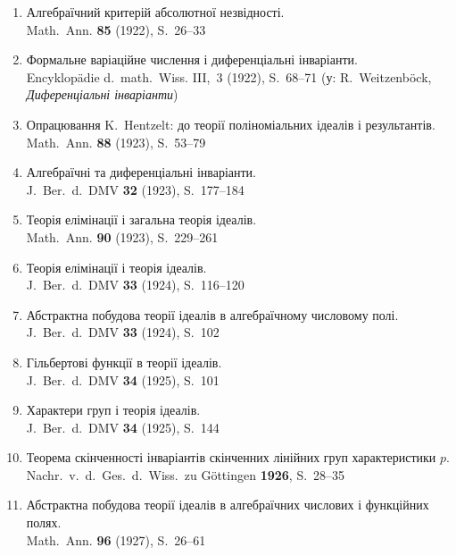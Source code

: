 \documentclass[11pt]{article}
\newcommand{\foreign}[1]{#1}
\begin{document}
\begin{enumerate}[label={\small\arabic*.},leftmargin=2em,itemsep=0.3em]
\item Алгебраїчний критерій абсолютної незвідності.\\
\foreign{Math.\ Ann.} \textbf{85} (1922), S.~26--33

\item Формальне варіаційне числення і диференціальні інваріанти.\\
\foreign{Encyklopädie d.\ math.\ Wiss.} III,\ 3 (1922), S.~68--71 (у:
R.\ Weitzenböck, \textit{Диференціальні інваріанти})

\item Опрацювання K.\ Hentzelt: до теорії поліноміальних ідеалів і результантів.\\
\foreign{Math.\ Ann.} \textbf{88} (1923), S.~53--79

\item Алгебраїчні та диференціальні інваріанти.\\
\foreign{J.\ Ber.\ d.\ DMV} \textbf{32} (1923), S.~177--184

\item Теорія елімінації і загальна теорія ідеалів.\\
\foreign{Math.\ Ann.} \textbf{90} (1923), S.~229--261

\item Теорія елімінації і теорія ідеалів.\\
\foreign{J.\ Ber.\ d.\ DMV} \textbf{33} (1924), S.~116--120

\item Абстрактна побудова теорії ідеалів в алгебраїчному числовому полі.\\
\foreign{J.\ Ber.\ d.\ DMV} \textbf{33} (1924), S.~102

\item Гільбертові функції в теорії ідеалів.\\
\foreign{J.\ Ber.\ d.\ DMV} \textbf{34} (1925), S.~101

\item Характери груп і теорія ідеалів.\\
\foreign{J.\ Ber.\ d.\ DMV} \textbf{34} (1925), S.~144

\item Теорема скінченності інваріантів скінченних лінійних груп характеристики $p$.\\
\foreign{Nachr.\ v.\ d.\ Ges.\ d.\ Wiss.\ zu Göttingen} \textbf{1926}, S.~28--35

\item Абстрактна побудова теорії ідеалів в алгебраїчних числових і функційних полях.\\
\foreign{Math.\ Ann.} \textbf{96} (1927), S.~26--61


\end{enumerate}
\end{document}
